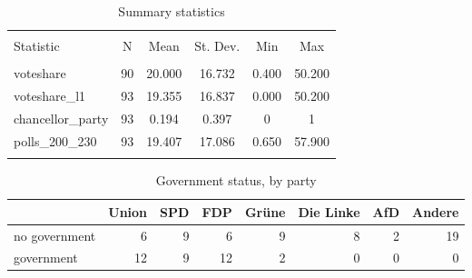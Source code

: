 \documentclass[oneside,twocolumn,11pt,english]{article}
\begin{document}
\begin{table}[!htbp] \centering 
  \caption{Summary statistics} 
  \label{} 
\begin{tabular}{@{\extracolsep{5pt}}lccccc} 
\\[-1.8ex]\hline 
\hline \\[-1.8ex] 
Statistic & \multicolumn{1}{c}{N} & \multicolumn{1}{c}{Mean} & \multicolumn{1}{c}{St. Dev.} & \multicolumn{1}{c}{Min} & \multicolumn{1}{c}{Max} \\ 
\hline \\[-1.8ex] 
voteshare & 90 & 20.000 & 16.732 & 0.400 & 50.200 \\ 
voteshare\_l1 & 93 & 19.355 & 16.837 & 0.000 & 50.200 \\ 
chancellor\_party & 93 & 0.194 & 0.397 & 0 & 1 \\ 
polls\_200\_230 & 93 & 19.407 & 17.086 & 0.650 & 57.900 \\ 
\hline \\[-1.8ex] 
\end{tabular} 
\end{table} 


\begin{table*}[t!]
\centering
\caption{Government status, by party} 
\begingroup\small
\begin{tabular}{lrrrrrrr}
  \toprule
 & Union & SPD & FDP & Grüne & Die Linke & AfD & Andere \\ 
  \midrule
no government & 6 & 9 & 6 & 9 & 8 & 2 & 19 \\ 
  government & 12 & 9 & 12 & 2 & 0 & 0 & 0 \\ 
   \bottomrule
\end{tabular}
\endgroup
\end{table*}
\end{document}

